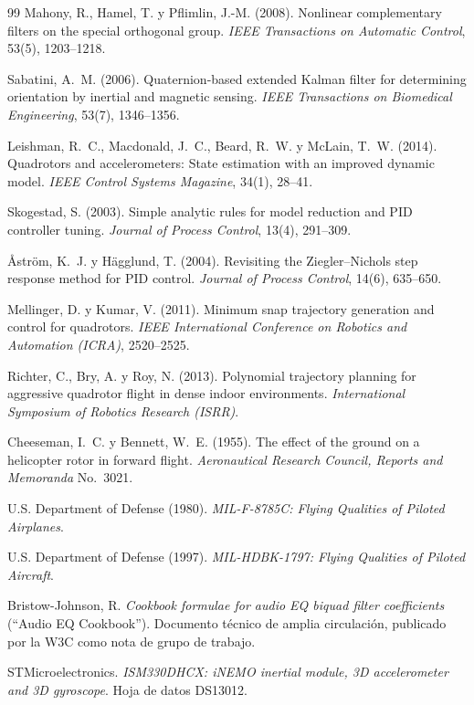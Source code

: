 \begin{thebibliography}{99}
 Mahony, R., Hamel, T. y Pflimlin, J.-M. (2008). Nonlinear
complementary filters on the special orthogonal group. \emph{IEEE
Transactions on Automatic Control}, 53(5), 1203--1218.

 Sabatini, A.~M. (2006). Quaternion-based extended
Kalman filter for determining orientation by inertial and magnetic sensing.
\emph{IEEE Transactions on Biomedical Engineering}, 53(7), 1346--1356.

 Leishman, R.~C., Macdonald, J.~C., Beard, R.~W. y
McLain, T.~W. (2014). Quadrotors and accelerometers: State estimation with
an improved dynamic model. \emph{IEEE Control Systems Magazine}, 34(1),
28--41.

 Skogestad, S. (2003). Simple analytic rules for model
reduction and PID controller tuning. \emph{Journal of Process Control},
13(4), 291--309.

 Åström, K.~J. y Hägglund, T. (2004). Revisiting the
Ziegler--Nichols step response method for PID control. \emph{Journal of
Process Control}, 14(6), 635--650.

 Mellinger, D. y Kumar, V. (2011). Minimum snap
trajectory generation and control for quadrotors. \emph{IEEE International
Conference on Robotics and Automation (ICRA)}, 2520--2525.

 Richter, C., Bry, A. y Roy, N. (2013). Polynomial
trajectory planning for aggressive quadrotor flight in dense indoor
environments. \emph{International Symposium of Robotics Research (ISRR)}.

 Cheeseman, I.~C. y Bennett, W.~E. (1955). The effect
of the ground on a helicopter rotor in forward flight. \emph{Aeronautical
Research Council, Reports and Memoranda} No.~3021.

 U.S. Department of Defense (1980). \emph{MIL-F-8785C:
Flying Qualities of Piloted Airplanes}.

 U.S. Department of Defense (1997). \emph{MIL-HDBK-1797:
Flying Qualities of Piloted Aircraft}.

 Bristow-Johnson, R. \emph{Cookbook formulae for audio EQ
biquad filter coefficients} (``Audio EQ Cookbook''). Documento técnico de
amplia circulación, publicado por la W3C como nota de grupo de trabajo.

 STMicroelectronics. \emph{ISM330DHCX: iNEMO inertial module,
3D accelerometer and 3D gyroscope}. Hoja de datos DS13012.


\end{thebibliography}
